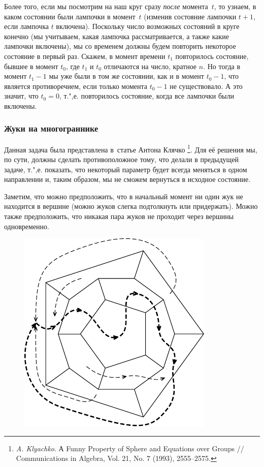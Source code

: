 \documentclass[twoside]{book}
\begin{document}
Более того, если мы посмотрим на наш круг сразу \emph{после} момента~$t$, то узнаем, в каком состоянии были лампочки в момент~$t$ (изменив состояние лампочки $t+1$, если лампочка $t$ включена).
Поскольку число возможных состояний в круге конечно (мы учитываем, какая лампочка рассматривается, а также какие лампочки включены),  мы со временем должны будем повторить некоторое состояние в первый раз.
Скажем, в момент времени $t_1$ повторилось состояние, бывшее в момент $t_0$, где $t_1$ и $t_0$ отличаются на число, кратное $n$.
Но тогда в момент $t_1 - 1$ мы уже были в том же состоянии, как и в момент $t_0 - 1$, что является противоречием, если только момента $t_0 - 1$ не существовало.
А это значит, что $t_0=0$, т.",е. повторилось состояние, когда все лампочки были включены.
\heart

\subsubsection*{Жуки на многограннике}%

Данная задача была представлена в~статье Антона Клячко%
\footnote{\emph{A. Klyachko}. А Funny Property of Sphere and Equations over Groups /\!/ {Com\-mu\-ni\-ca\-tions in Algebra}, Vol. 21, No. 7 (1993), 2555--2575.}. 
Для её решения мы, по сути, должны сделать противоположное тому, что делали в предыдущей задаче, т.",е. показать, что некоторый параметр будет всегда меняться в одном направлении и, таким образом, мы не сможем вернуться в исходное состояние.

\medskip

Заметим, что можно предположить, что в начальный момент ни один жук не находится в вершине (можно жуков слегка подтолкнуть или придержать).
Можно также предположить, что никакая пара жуков не проходит через вершины одновременно.

\begin{figure}[!ht]
\centering
\includegraphics{mp/wink-22}
\end{figure}
\end{document}
